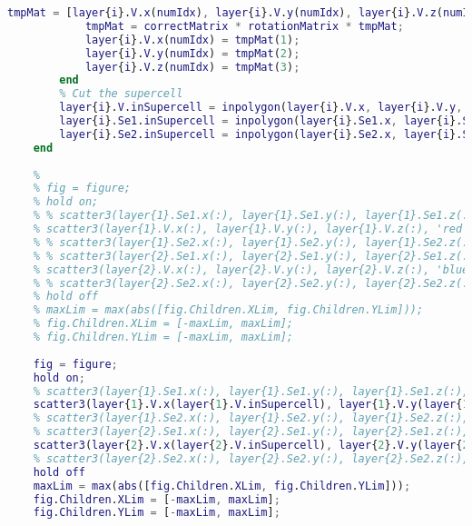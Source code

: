 \begin{lstlisting}[language=Matlab]
            tmpMat = [layer{i}.V.x(numIdx), layer{i}.V.y(numIdx), layer{i}.V.z(numIdx)]';
            tmpMat = correctMatrix * rotationMatrix * tmpMat;
            layer{i}.V.x(numIdx) = tmpMat(1);
            layer{i}.V.y(numIdx) = tmpMat(2);
            layer{i}.V.z(numIdx) = tmpMat(3);
        end
        % Cut the supercell
        layer{i}.V.inSupercell = inpolygon(layer{i}.V.x, layer{i}.V.y, supercellBoundx, supercellBoundy);
        layer{i}.Se1.inSupercell = inpolygon(layer{i}.Se1.x, layer{i}.Se1.y, supercellBoundx, supercellBoundy);
        layer{i}.Se2.inSupercell = inpolygon(layer{i}.Se2.x, layer{i}.Se2.y, supercellBoundx, supercellBoundy);
    end
    
    % 
    % fig = figure;
    % hold on;
    % % scatter3(layer{1}.Se1.x(:), layer{1}.Se1.y(:), layer{1}.Se1.z(:), 'green');
    % scatter3(layer{1}.V.x(:), layer{1}.V.y(:), layer{1}.V.z(:), 'red');
    % % scatter3(layer{1}.Se2.x(:), layer{1}.Se2.y(:), layer{1}.Se2.z(:), 'green');
    % % scatter3(layer{2}.Se1.x(:), layer{2}.Se1.y(:), layer{2}.Se1.z(:), 'green');
    % scatter3(layer{2}.V.x(:), layer{2}.V.y(:), layer{2}.V.z(:), 'blue');
    % % scatter3(layer{2}.Se2.x(:), layer{2}.Se2.y(:), layer{2}.Se2.z(:), 'green');
    % hold off
    % maxLim = max(abs([fig.Children.XLim, fig.Children.YLim]));
    % fig.Children.XLim = [-maxLim, maxLim];
    % fig.Children.YLim = [-maxLim, maxLim];
    
    fig = figure;
    hold on;
    % scatter3(layer{1}.Se1.x(:), layer{1}.Se1.y(:), layer{1}.Se1.z(:), 'green');
    scatter3(layer{1}.V.x(layer{1}.V.inSupercell), layer{1}.V.y(layer{1}.V.inSupercell), layer{1}.V.z(layer{1}.V.inSupercell), 'red');
    % scatter3(layer{1}.Se2.x(:), layer{1}.Se2.y(:), layer{1}.Se2.z(:), 'green');
    % scatter3(layer{2}.Se1.x(:), layer{2}.Se1.y(:), layer{2}.Se1.z(:), 'green');
    scatter3(layer{2}.V.x(layer{2}.V.inSupercell), layer{2}.V.y(layer{2}.V.inSupercell), layer{2}.V.z(layer{2}.V.inSupercell), 'blue');
    % scatter3(layer{2}.Se2.x(:), layer{2}.Se2.y(:), layer{2}.Se2.z(:), 'green');
    hold off
    maxLim = max(abs([fig.Children.XLim, fig.Children.YLim]));
    fig.Children.XLim = [-maxLim, maxLim];
    fig.Children.YLim = [-maxLim, maxLim];
    

\end{lstlisting}
